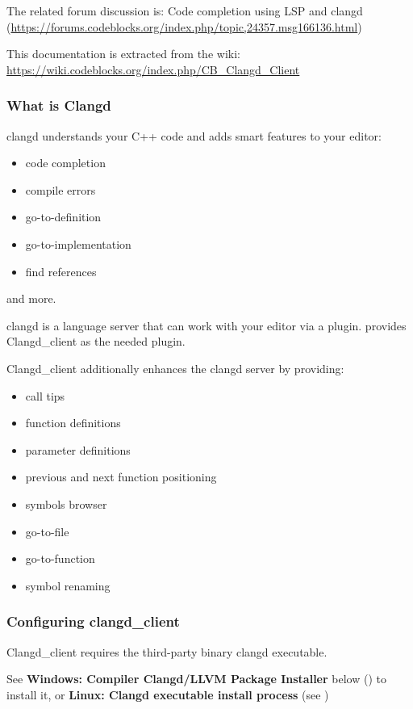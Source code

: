 The related forum discussion is: Code completion using LSP and clangd\newline
(\url{https://forums.codeblocks.org/index.php/topic,24357.msg166136.html})

This documentation is extracted from the wiki: \url{https://wiki.codeblocks.org/index.php/CB_Clangd_Client}

\subsubsection{What is Clangd}

clangd understands your C++ code and adds smart features to your editor:
\begin{itemize}[noitemsep]
\item code completion
\item compile errors
\item go-to-definition
\item go-to-implementation
\item find references
\end{itemize}
and more.

clangd is a language server that can work with your editor via a plugin.\newline
\codeblocks provides Clangd\_client as the needed plugin.

Clangd\_client additionally enhances the clangd server by providing:
\begin{itemize}[noitemsep]
\item call tips
\item function definitions
\item parameter definitions
\item previous and next function positioning
\item symbols browser
\item go-to-file
\item go-to-function
\item symbol renaming
\end{itemize}

\subsubsection{Configuring clangd\_client}\label{sec:cfg_client}

Clangd\_client requires the third-party binary clangd executable.

See \textbf{Windows: Compiler Clangd/LLVM Package Installer} below () to install it, or \textbf{Linux: Clangd executable install process} (see )

